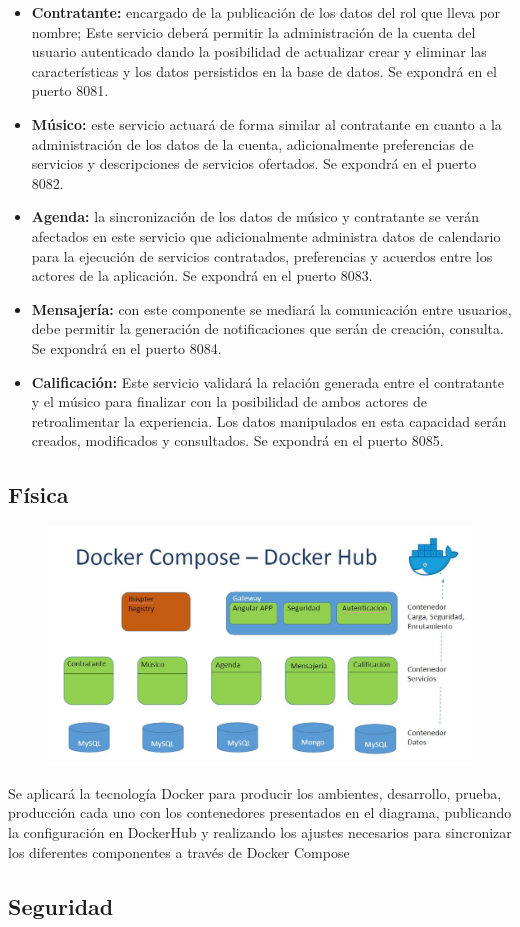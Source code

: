 \begin{itemize}

\item \textbf{Contratante:} encargado de la publicación de los datos del rol que lleva por nombre; Este servicio deberá permitir la administración de la cuenta del usuario autenticado dando la posibilidad de actualizar crear y eliminar las características y los datos persistidos en la base de datos. Se expondrá en el puerto 8081.
\item \textbf{Músico:} este servicio actuará de forma similar al contratante en cuanto a la administración de los datos de la cuenta, adicionalmente preferencias de servicios y descripciones de servicios ofertados. Se expondrá en el puerto 8082.
\item \textbf{Agenda:} la sincronización de los datos de músico y contratante se verán afectados en este servicio que adicionalmente administra datos de calendario para la ejecución de servicios contratados, preferencias y acuerdos entre los actores de la aplicación. Se expondrá en el puerto 8083.
\item \textbf{Mensajería:} con este componente se mediará la comunicación entre usuarios, debe permitir la generación de notificaciones que serán de creación, consulta. Se expondrá en el puerto 8084.
\item \textbf{Calificación:} Este servicio validará la relación generada entre el contratante y el músico para finalizar con la posibilidad de ambos actores de retroalimentar la experiencia. Los datos manipulados en esta capacidad serán creados, modificados y consultados. Se expondrá en el puerto 8085.
\end{itemize}


\subsection{Física}
\begin{figure}[h!]
 \centering
\includegraphics[width=\linewidth]{Desarrollo/Arquitectura/imgs/contenedores.JPG}
\end{figure}
Se aplicará la tecnología Docker para producir los ambientes, desarrollo, prueba, producción cada uno con los contenedores presentados en el diagrama, publicando la configuración en DockerHub y realizando los ajustes necesarios para sincronizar los diferentes componentes a través de Docker Compose

\subsection{Seguridad}